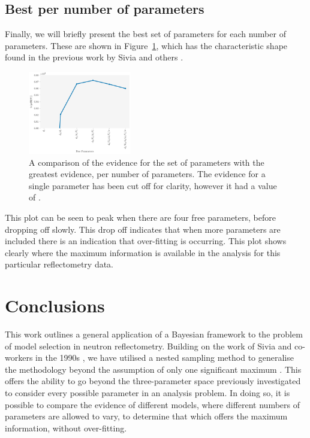 \documentclass[%
 reprint,
 superscriptaddress,
 amsmath,amssymb,
 aps,
]{revtex4-1}
\begin{document}
\subsection{Best per number of parameters}

Finally, we will briefly present the best set of parameters for each number of parameters. 
These are shown in Figure~\ref{fig:best_per}, which has the characteristic shape found in the previous work by Sivia and others \cite{sivia_analysis_1991,sivia_introduction_1993,sivia_bayesian_1998,sivia_data_2005}. 
%
\begin{figure}
\includegraphics[width=0.4\textwidth]{best_per}
\caption{\label{fig:best_per} A comparison of the evidence for the set of parameters with the greatest evidence, per number of parameters. The evidence for a single parameter has been cut off for clarity, however it had a value of \protect.}
\end{figure}
%
This plot can be seen to peak when there are four free parameters, before dropping off slowly. 
This drop off indicates that when more parameters are included there is an indication that over-fitting is occurring. 
This plot shows clearly where the maximum information is available in the analysis for this particular reflectometry data. 

\section{\label{conclusions} Conclusions}

This work outlines a general application of a Bayesian framework to the problem of model selection in neutron reflectometry. 
Building on the work of Sivia and co-workers in the 1990s \cite{sivia_bayesian_1998}, we have utilised a nested sampling method to generalise the methodology beyond the assumption of only one significant maximum \cite{sivia_analysis_1991}. 
This offers the ability to go beyond the three-parameter space previously investigated to consider every possible parameter in an analysis problem.
In doing so, it is possible to compare the evidence of different models, where different numbers of parameters are allowed to vary, to determine that which offers the maximum information, without over-fitting. 
\end{document}
